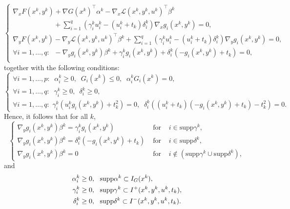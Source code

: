 	\begin{equation}\label{S1}
	\left\{
	\begin{array}{l}
	\nabla_{x}F(x^{k},y^{k})+\nabla G(x^{k})^{\top}\alpha^{k}-\nabla_{x}\mathcal{L}(x^{k},y^{k},u^{k})^{\top}\beta^{k}\\
    \qquad \qquad \qquad +\sum\limits_{i=1}^{q}\left(\gamma_{i}^{k} u_{i}^{k}-(u_{i}^{k}+t_{k})\delta_{i}^{k}\right)  \nabla_{x}g_{i}(x^{k},y^{k})=0, \\
	\nabla_{y}F(x^{k},y^{k})-\nabla_{y}\mathcal{L}(x^{k},y^{k},u^{k})^{\top}
	\beta^{k}+\sum\limits_{i=1}^{q}\left( \gamma_{i}^{k} u_{i}^{k}-(u_{i}^{k}+t_{k})\delta_{i}^{k}\right)  \nabla_{y}g_{i}(x^{k},y^{k})=0,\\
	\forall i=1, \ldots, q:\;\; -\nabla _{y}g_{i}(x^{k},y^{k})\beta ^{k}+\gamma
	_{i}^{k}g_{i}(x^{k},y^{k})+\delta _{i}^{k}(-g_{i}(x^{k},y^{k})+t_{k})=0, \\[1ex]
	\end{array}
	\right.
	\end{equation}
	together with the following conditions:
	\begin{equation}\label{S2}
	\left\{\begin{array}{l}
	\forall i=1, \ldots, p:\;\;\alpha_{i}^{k}\geq0,\;\; G_{i}(x^{k})\leq0,\;\; \alpha_{i}^{k}G_{i}(x^{k})=0, \\[1ex]
	\forall i=1, \ldots, q:\;\;\gamma _{i}^{k}\geq 0,\,\,\, \delta _{i}^{k}\geq
	0,\;\;\\[1ex]
	\forall i=1, \ldots, q:\,\, \gamma
	_{i}^{k}(u_{i}^{k}g_{i}(x^{k},y^{k})+t_{k}^{2})=0, \;\; \delta
	_{i}^{k}((u_{i}^{k}+t_{k})(-g_{i}(x^{k},y^{k})+t_{k})-t_{k}^{2})=0.
	\end{array}
	\right.
	\end{equation}
	Hence, it follows that for all $k$,
	\begin{equation}
	\left\{
	\begin{array}{lll}
	\nabla_{y}g_{i}(x^{k},y^{k})\beta^{k}=\gamma_{i}^{k}g_{i}(x^{k},y^{k}) & \mbox{ for } & i\in\mathrm{supp}\gamma^{k},\\[1ex]
	\nabla_{y}g_{i}(x^{k},y^{k})\beta^{k}=\delta_{i}^{k}(-g_{i}(x^{k},y^{k})+t_{k}) & \mbox{ for } & i\in\mathrm{supp}\delta^{k},\\[1ex]
	\nabla_{y}g_{i}(x^{k},y^{k})\beta^{k}=0 & \mbox{ for } & i\notin (\mathrm{supp}\gamma^{k}\cup\mathrm{supp}\delta^{k}),
	\end{array}
	\right. \label{S2b}
	\end{equation}
	and
	\begin{align}
	\alpha_{i}^{k} &  \geq0,\text{ \ }\mathrm{supp}\alpha^{k}\subset I_{G}
	(x^{k}),\medskip\label{S3}\\
	\gamma_{i}^{k} &  \geq0,\text{ \ }\mathrm{supp}\gamma^{k}\subset I^{+}
	(x^{k},y^{k},u^{k},t_{k}),\medskip\label{S5}\\
	\delta_{i}^{k} &  \geq0,\text{ \ }\mathrm{supp}\delta^{k}\subset I^{-}
	(x^{k},y^{k},u^{k},t_{k}).\label{S6}
	\end{align}
